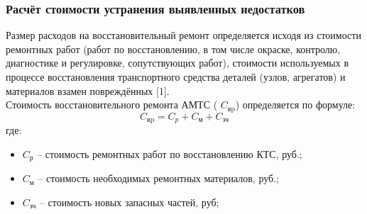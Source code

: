 {   
 
	

   

\subsubsection*{Расчёт стоимости устранения выявленных недостатков}

\par Размер расходов на восстановительный ремонт определяется исходя из стоимости ремонтных работ (работ по восстановлению, в том числе окраске, контролю, диагностике и регулировке, сопутствующих работ), стоимости используемых в процессе восстановления транспортного средства деталей (узлов, агрегатов) и материалов взамен повреждённых [1].\\
%                                         
Стоимость восстановительного ремонта АМТС ( $ C_\text{вp} $) определяется по формуле:
%
\begin{equation}\label{eq:r}
C_\text{вp} =C_p + C_\text{м} + C_\text{зч} 
\end{equation}
%
\noindent где:
%
\begin{itemize}
	\item[ ]$C_\text {р} $ --  стоимость ремонтных работ по восстановлению КТС, руб.;
	\item[ ]$ C_\text{м} $ --  стоимость необходимых ремонтных материалов, руб.;
	\item[ ]$ C_\text{зч} $ --  стоимость новых запасных частей, руб;
\end{itemize}

}
